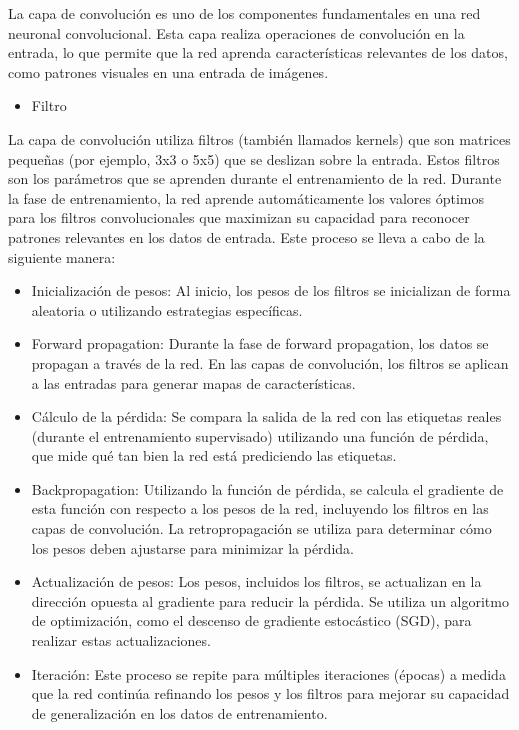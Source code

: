 La capa de convolución es uno de los componentes fundamentales en una red neuronal convolucional. Esta capa realiza operaciones de convolución en la entrada, lo que permite que la red aprenda características relevantes de los datos, como patrones visuales en una entrada de imágenes.
 \begin{itemize}
\item Filtro
 \end{itemize}


La capa de convolución utiliza filtros (también llamados kernels) que son matrices pequeñas (por ejemplo, 3x3 o 5x5) que se deslizan sobre la entrada. Estos filtros son los parámetros que se aprenden durante el entrenamiento de la red. Durante la fase de entrenamiento, la red aprende automáticamente los valores óptimos para los filtros convolucionales que maximizan su capacidad para reconocer patrones relevantes en los datos de entrada. Este proceso se lleva a cabo de la siguiente manera:
 
 \begin{itemize}
	\item Inicialización de pesos: Al inicio, los pesos de los filtros se inicializan de forma aleatoria o utilizando estrategias específicas.
	
	\item Forward propagation: Durante la fase de forward propagation, los datos se propagan a través de la red. En las capas de convolución, los filtros se aplican a las entradas para generar mapas de características. 
	
	\item Cálculo de la pérdida: Se compara la salida de la red con las etiquetas reales (durante el entrenamiento supervisado) utilizando una función de pérdida, que mide qué tan bien la red está prediciendo las etiquetas.
	
	\item Backpropagation: Utilizando la función de pérdida, se calcula el gradiente de esta función con respecto a los pesos de la red, incluyendo los filtros en las capas de convolución. La retropropagación se utiliza para determinar cómo los pesos deben ajustarse para minimizar la pérdida.
	
	\item Actualización de pesos: Los pesos, incluidos los filtros, se actualizan en la dirección opuesta al gradiente para reducir la pérdida. Se utiliza un algoritmo de optimización, como el descenso de gradiente estocástico (SGD), para realizar estas actualizaciones.

	\item Iteración: Este proceso se repite para múltiples iteraciones (épocas) a medida que la red continúa refinando los pesos y los filtros para mejorar su capacidad de generalización en los datos de entrenamiento.
\end{itemize}

